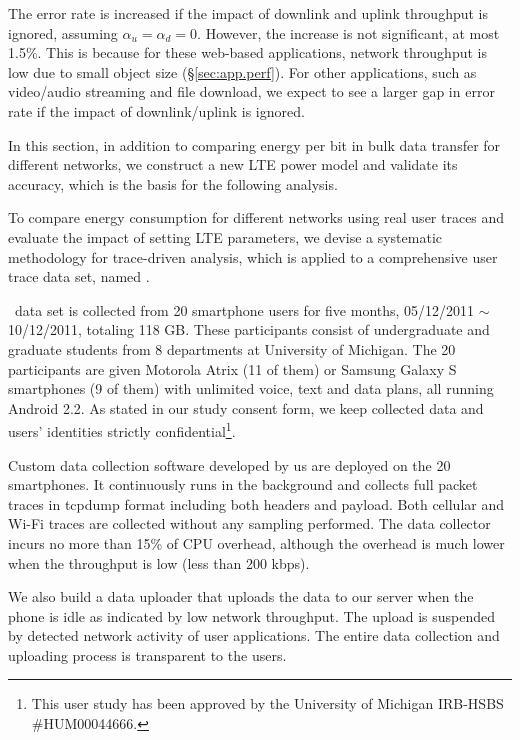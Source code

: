 The error rate is increased if the impact of downlink and uplink throughput is ignored, \ie assuming $\alpha_u = \alpha_d = 0$. However, the increase is not significant, at most 1.5\%. This is because for these web-based applications, network throughput is low due to small object size (\S\ref{sec:app.perf}). For other applications, such as video/audio streaming and file download, we expect to see a larger gap in error rate if the impact of downlink/uplink is ignored.

In this section, in addition to comparing energy per bit in bulk data transfer for different networks, we construct a new LTE power model and validate its accuracy, which is the basis for the following analysis.


To compare energy consumption for different networks using real user traces and evaluate the impact of setting LTE parameters, we devise a systematic methodology for trace-driven analysis, which is applied to a comprehensive user trace data set, named \UMICH.


\UMICH~data set is collected from 20 smartphone users for five months, 05/12/2011 $\sim$ 10/12/2011, totaling 118 GB.
These participants consist of undergraduate and graduate students from 8 departments at University of Michigan. The 20 participants are given Motorola Atrix (11 of them) or Samsung Galaxy S smartphones (9 of them) with unlimited voice, text and data plans, all running Android 2.2. As stated in our study consent form, we keep collected data and users' identities strictly confidential\footnote{This user study has been approved by the University of Michigan IRB-HSBS \#HUM00044666.}.

Custom data collection software developed by us are deployed on the 20 smartphones. It continuously runs in the background and collects full packet traces in tcpdump format including both headers and payload. Both cellular and Wi-Fi traces are collected without any sampling performed. The data collector incurs no more than 15\% of CPU overhead, although the overhead is much lower when the throughput is low (\eg less than 200 kbps).

We also build a data uploader that uploads the data to our server when the phone is idle as indicated by low network throughput. The upload is suspended by detected network activity of user applications. The entire data collection and uploading process is transparent to the users.


